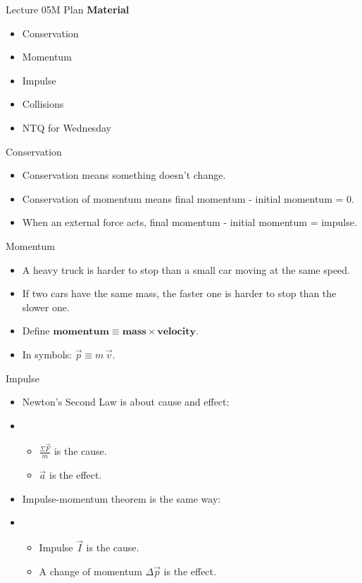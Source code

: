 \documentclass[english]{beamer}
\begin{document}
\begin{frame}{Lecture 05M Plan}
  \textbf{Material}
  \begin{itemize}
    \item Conservation
    \item Momentum
    \item Impulse
    \item Collisions
    \item NTQ for Wednesday
  \end{itemize}
\end{frame}

\begin{frame}{Conservation}
  \begin{itemize}
    \item Conservation means something doesn't change.
    \item Conservation of momentum means final momentum - initial momentum = 0.
    \item When an external force acts, final momentum - initial momentum = impulse.
  \end{itemize}
\end{frame}

\begin{frame}{Momentum}
  \begin{itemize}
    \item A heavy truck is harder to stop than a small car moving at the same speed.
    \item If two cars have the same mass, the faster one is harder to stop than the slower one.
    \item Define $\textbf{momentum} \equiv \textbf{mass} \times \textbf{velocity}$.
    \item In symbols: $\vec{p} \equiv m \, \vec{v}$.
  \end{itemize}
\end{frame}

\begin{frame}{Impulse}
  \begin{itemize}
    \item Newton's Second Law is about cause and effect:
    \item \begin{itemize}
      \item $\frac{\Sigma \vec{F}}{m}$ is the cause.
      \item $\vec{a}$ is the effect.
    \end{itemize}
    \item Impulse-momentum theorem is the same way:
    \item \begin{itemize}
      \item Impulse $\vec{I}$ is the cause.
      \item A change of momentum $\Delta \vec{p}$ is the effect.
    \end{itemize}
  \end{itemize}
\end{frame}
\end{document}
